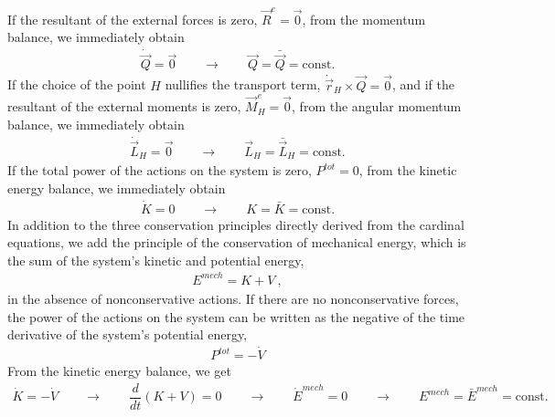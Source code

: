 \documentclass[letterpaper,10pt,english]{jupyterBook}
\begin{document}
\sphinxAtStartPar
{} If the resultant of the external forces is zero, \(\vec{R}^e = \vec{0}\), from the momentum balance, we immediately obtain
\begin{equation*}
\begin{split}\dot{\vec{Q}} = \vec{0} \qquad \rightarrow \qquad \vec{Q} = \bar{\vec{Q}} = \text{const.}\end{split}
\end{equation*}
\sphinxAtStartPar
{} If the choice of the point \(H\) nullifies the transport term, \(\dot{\vec{r}}_H \times \vec{Q} = \vec{0}\), and if the resultant of the external moments is zero, \(\vec{M}^e_H = \vec{0}\), from the angular momentum balance, we immediately obtain
\begin{equation*}
\begin{split}\dot{\vec{L}}_H = \vec{0} \qquad \rightarrow \qquad \vec{L}_H = \bar{\vec{L}}_H = \text{const.}\end{split}
\end{equation*}
\sphinxAtStartPar
{} If the total power of the actions on the system is zero, \(P^{tot} = 0\), from the kinetic energy balance, we immediately obtain
\begin{equation*}
\begin{split}\dot{K} = 0 \qquad \rightarrow \qquad K = \bar{K} = \text{const.}\end{split}
\end{equation*}
\sphinxAtStartPar
{} In addition to the three conservation principles directly derived from the cardinal equations, we add the principle of the conservation of mechanical energy, which is the sum of the system’s kinetic and potential energy,
\begin{equation*}
\begin{split}E^{mech} = K + V \ ,\end{split}
\end{equation*}
\sphinxAtStartPar
in the absence of non\sphinxhyphen{}conservative actions. If there are no non\sphinxhyphen{}conservative forces, the power of the actions on the system can be written as the negative of the time derivative of the system’s potential energy,
\begin{equation*}
\begin{split}P^{tot} = -\dot{V}\end{split}
\end{equation*}
\sphinxAtStartPar
From the kinetic energy balance, we get
\begin{equation*}
\begin{split}\dot{K} = - \dot{V} \qquad \rightarrow \qquad \dfrac{d}{dt}(K+V) = 0 \qquad \rightarrow \qquad \dot{E}^{mech} = 0 \qquad \rightarrow \qquad E^{mech} = \bar{E}^{mech} = \text{const.}\end{split}
\end{equation*}
\sphinxstepscope
\end{document}
